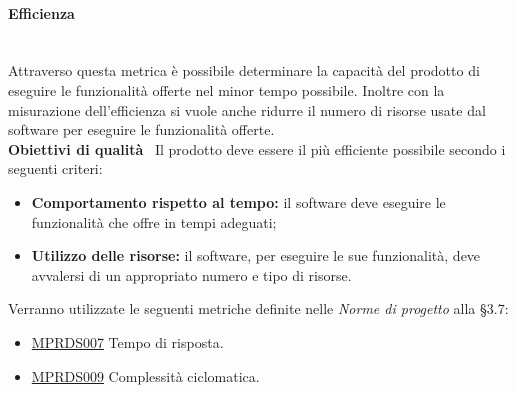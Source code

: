 \paragraph{Efficienza}\mbox{}\\[0.4cm]
Attraverso questa metrica è possibile determinare la capacità del prodotto di eseguire le funzionalità offerte nel minor tempo possibile.
Inoltre con la misurazione dell'efficienza si vuole anche ridurre il numero di risorse usate dal software per eseguire le funzionalità offerte.\\[0.4cm]
\textbf{Obiettivi di qualità} \ Il prodotto deve essere il più efficiente possibile secondo i seguenti criteri:
\begin{itemize}
	\item \textbf{Comportamento rispetto al tempo:} il software deve eseguire le funzionalità che offre in tempi adeguati;
	\item \textbf{Utilizzo delle risorse:} il software, per eseguire le sue funzionalità, deve avvalersi di un appropriato numero e tipo di risorse.
\end{itemize}
Verranno utilizzate le seguenti metriche definite nelle \textit{Norme di progetto} alla §3.7:
\begin{itemize}
	\item \hyperref[sec:qualita_software]{MPRDS007} Tempo di risposta.
	\item \hyperref[sec:qualita_software]{MPRDS009} Complessità ciclomatica.
\end{itemize}

